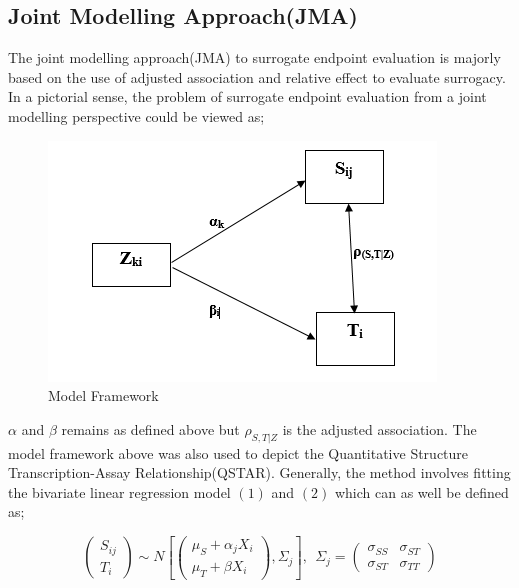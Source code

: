 \documentclass[a4paper,12pt]{article}
\begin{document}
	\subsection{Joint Modelling Approach(JMA)}
	The joint modelling approach(JMA) to surrogate endpoint evaluation is majorly based on the use of adjusted association and relative effect to evaluate surrogacy\citep{surrogate1,surrogate2}. In a pictorial sense, the problem of surrogate endpoint evaluation from a joint modelling perspective could be viewed as; 
	\begin{figure}[H]
		\centering
		\includegraphics[scale=0.7]{modelframework.PNG}
		\caption{Model Framework}
	\end{figure}
	
	$\alpha$ and $\beta$ remains as defined above but $\rho_{S,T|Z}$ is the adjusted association.
	The model framework above was also used to depict the Quantitative Structure Transcription-Assay Relationship(QSTAR)\citep{surrogate1}.  Generally, the method involves fitting the bivariate linear regression model $(1)$ and $(2)$ which can as well be defined as;
	
	\begin{equation}\label{bivariateregression}
	\left( \begin{array}{c}
	S_{ij} \\
	T_{i}
	\end{array} \right) \sim N\left[ \left( \begin{array}{c}
	\mu_{S} + \alpha_jX_i  \\
	\mu_{T} + \beta X_i
	\end{array}
	\right), \Sigma_j \right], \ \ \Sigma_j = \left( \begin{array}{cc}
	\sigma_{SS} & \sigma_{ST}\\
	\sigma_{ST} & \sigma_{TT}
	\end{array}\right)
	\end{equation}
	
\end{document}
